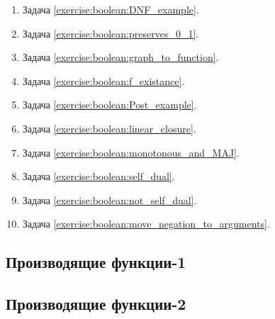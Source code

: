\begin{enumerate}[label=\textbf{№\arabic*}:]
    \item Задача \ref{exercise:boolean:DNF_example}.
    \item Задача \ref{exercise:boolean:preserves_0_1}.
    \item Задача \ref{exercise:boolean:graph_to_function}.
    \item Задача \ref{exercise:boolean:f_existance}.
    \item Задача \ref{exercise:boolean:Post_example}.
    \item Задача \ref{exercise:boolean:linear_closure}.
    \item Задача \ref{exercise:boolean:monotonous_and_MAJ}.
    \item Задача \ref{exercise:boolean:self_dual}.
    \item Задача \ref{exercise:boolean:not_self_dual}.
    \item Задача \ref{exercise:boolean:move_negation_to_arguments}.
\end{enumerate}


\subsection*{Производящие функции-1}

\subsection*{Производящие функции-2}
